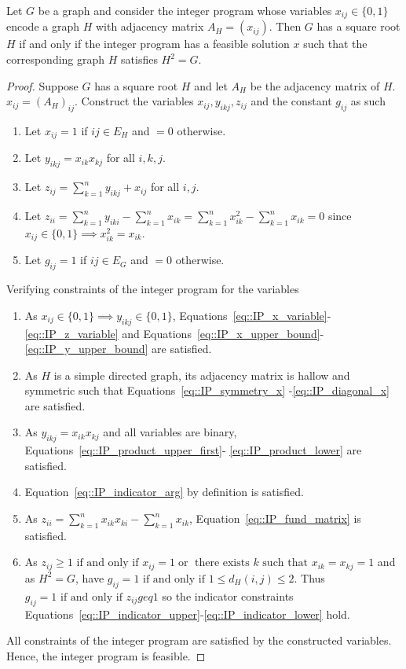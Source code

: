 \begin{theorem} \label{theorem::IP_gives_root}
Let $G$ be a graph and consider the integer program whose variables $x_{ij} \in \{0,1\}$ encode a graph $H$ with adjacency matrix $A_H = (x_{ij})$. Then $G$ has a square root $H$ if and only if the integer  program has a feasible solution $x$ such that the corresponding graph $H$ satisfies $H^2 = G$.
\end{theorem}
\begin{proof}
  Suppose $G$ has a square root $H$ and let $A_H$ be the adjacency matrix of $H$.  $x_{ij} = (A_H)_{ij}$. Construct the variables $x_{ij}, y_{ikj}, z_{ij}$ and the constant $g_{ij}$ as such 
  \begin{enumerate}[label=\roman*)]
    \item Let $x_{ij} = 1$ if $ij \in E_H$ and $=0$ otherwise. 
    \item Let $y_{ikj} = x_{ik}x_{kj}$ for all $i,k,j$. 
    \item Let $\displaystyle z_{ij} = \sum_{k = 1}^{n} y_{ikj} + x_{ij} $ for all $i,j$. 
    \item Let $\displaystyle z_{ii} = \sum_{k  = 1}^{n} y_{iki} - \sum_{k = 1}^{n} x_{ik} =  \sum_{k = 1}^{n} x_{ik}^2 -  \sum_{k = 1}^{n} x_{ik} = 0 $
    since $x_{ij} \in \{0 , 1\} \implies x_{ik}^2 = x_{ik}$. 
    \item Let $g_{ij} = 1$ if $ij \in E_G$ and $=0$ otherwise. 
  \end{enumerate}
  Verifying constraints of the integer program for the variables 
  \begin{enumerate}[label=\roman*)]
    \item As $x_{ij} \in \{0, 1 \} \implies y_{ikj}  \in \{0, 1 \} $, Equations~\eqref{eq::IP_x_variable}-\eqref{eq::IP_z_variable}
    and Equations~\eqref{eq::IP_x_upper_bound}-\eqref{eq::IP_y_upper_bound} are satisfied.  
    \item As $H$ is a simple directed graph, its adjacency matrix is hallow and symmetric such that Equations~\eqref{eq::IP_symmetry_x}
    -\eqref{eq::IP_diagonal_x} are satisfied.  
    \item As $y_{ikj} = x_{ik}x_{kj}$ and all variables are binary, Equations~\eqref{eq::IP_product_upper_first}-
    \eqref{eq::IP_product_lower} are satisfied. 
    \item Equation~\eqref{eq::IP_indicator_arg} by definition is satisfied. 
    \item As $\displaystyle z_{ii} = \sum_{k = 1}^{n} x_{ik}x_{ki} - \sum_{k = 1}^{n} x_{ik}$, Equation~\eqref{eq::IP_fund_matrix} is satisfied. 
    \item As $\displaystyle z_{ij} \geq 1 \text{ if and only if } x_{ij} = 1 \; \text{or} \; \text{ there exists } k \text{ such that } x_{ik}=x_{kj}= 1$ and as $H^2 = G$,
    have $g_{ij} = 1 \text{ if and only if } 1 \leq d_H(i,j) \leq 2$. Thus $g_{ij} = 1 \text{ if and only if } z_{ij}geq 1$ so the indicator 
    constraints Equations~\eqref{eq::IP_indicator_upper}-\eqref{eq::IP_indicator_lower} hold. 
  \end{enumerate}
  All constraints of the integer program are satisfied by the constructed variables. Hence, the integer program is feasible.


\end{proof}
